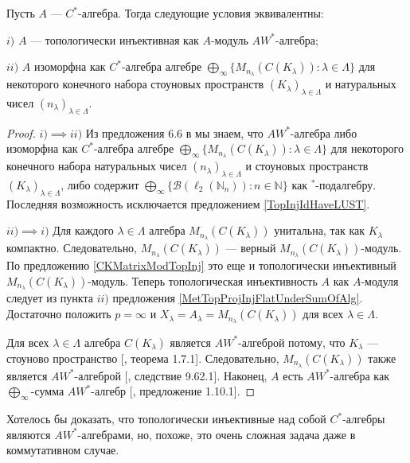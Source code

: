 \begin{theorem}\label{TopInjAWStarAlgCharac} Пусть $A$ --- $C^*$-алгебра. Тогда следующие условия эквивалентны:

$i)$ $A$ --- топологически инъективная как $A$-модуль $AW^*$-алгебра;

$ii)$ $A$ изоморфна как $C^*$-алгебра алгебре $\bigoplus_\infty\{M_{n_\lambda}(C(K_\lambda)):\lambda\in\Lambda\}$ для некоторого конечного набора стоуновых пространств $(K_\lambda)_{\lambda\in\Lambda}$ и натуральных чисел $(n_\lambda)_{\lambda\in\Lambda}$.
\end{theorem}
\begin{proof}$i)\implies ii)$ Из предложения 6.6 в \cite{SmithDecompPropCStarAlg} мы знаем, что $AW^*$-алгебра либо изоморфна как $C^*$-алгебра алгебре $\bigoplus_\infty\{M_{n_\lambda}(C(K_\lambda)):\lambda\in\Lambda\}$ для некоторого конечного набора натуральных чисел $(n_\lambda)_{\lambda\in\Lambda}$ и стоуновых пространств $(K_\lambda)_{\lambda\in\Lambda}$, либо содержит $\bigoplus_\infty\{ \mathcal{B}(\ell_2(\mathbb{N}_n)):n\in\mathbb{N}\}$ как ${}^*$-подалгебру. Последняя возможность исключается предложением \ref{TopInjIdHaveLUST}.

$ii)\implies i)$ Для каждого $\lambda\in\Lambda$ алгебра $M_{n_\lambda}(C(K_\lambda))$ унитальна, так как $K_\lambda$ компактно. Следовательно, $M_{n_\lambda}(C(K_\lambda))$ --- верный $M_{n_\lambda}(C(K_\lambda))$-модуль. По предложению \ref{CKMatrixModTopInj} 
это еще и топологически инъективный $M_{n_\lambda}(C(K_\lambda))$-модуль. Теперь топологическая инъективность $A$ как $A$-модуля следует из пункта $ii)$ предложения \ref{MetTopProjInjFlatUnderSumOfAlg}. Достаточно положить $p=\infty$ и $X_\lambda=A_\lambda=M_{n_\lambda}(C(K_\lambda))$ для всех $\lambda\in\Lambda$. 

Для всех $\lambda\in\Lambda$ алгебра $C(K_\lambda)$ является $AW^*$-алгеброй потому, что $K_\lambda$ --- стоуново пространство [\cite{BerbBaerStarRings}, теорема 1.7.1]. Следовательно, $M_{n_\lambda}(C(K_\lambda))$ также является $AW^*$-алгеброй [\cite{BerbBaerStarRings}, следствие 9.62.1]. Наконец, $A$ есть $AW^*$-алгебра как $\bigoplus_\infty$-сумма $AW^*$-алгебр [\cite{BerbBaerStarRings}, предложение 1.10.1].
\end{proof}

Хотелось бы доказать, что топологически инъективные над собой $C^*$-алгебры являются $AW^*$-алгебрами, но, похоже, это очень сложная задача даже в коммутативном случае.


